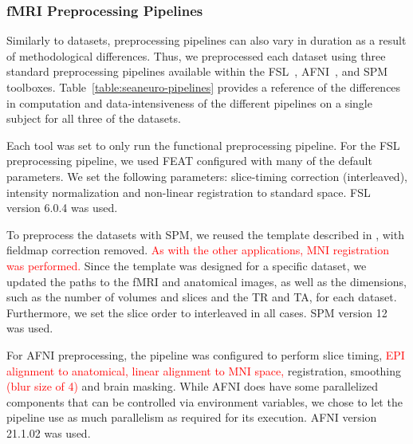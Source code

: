 \documentclass[pdflatex,sn-mathphys-num]{sn-jnl}
\newcommand{\vhs}[1]{\textcolor{red}{#1}}
\theoremstyle{thmstyleone}%
\theoremstyle{thmstyletwo}%
\theoremstyle{thmstylethree}%
\begin{document}
    
    
    \subsubsection{fMRI Preprocessing Pipelines}
    
    Similarly to datasets, preprocessing pipelines can also vary in duration as
    a result of methodological differences. Thus, we preprocessed each dataset
    using three standard preprocessing pipelines available within the FSL~\cite{fsl},
    AFNI~\cite{cox1996afni}, and SPM~\cite{spm} toolboxes.
    Table~\ref{table:seaneuro-pipelines} provides a reference of the differences
    in computation and data-intensiveness of the different pipelines on a single
    subject for all three of the datasets.
    
    Each tool was set to only run the functional preprocessing pipeline. For the FSL preprocessing pipeline, 
    we used FEAT configured with many of
    the default parameters. We set the following parameters: slice-timing
    correction (interleaved), intensity normalization and non-linear
    registration to standard space. FSL version 6.0.4 was used.
    
    To preprocess the datasets with SPM, we reused the template described in
    \cite{haitas2021age}, with fieldmap correction removed. \vhs{As with the other applications, MNI registration was performed.} Since the template was
    designed for a specific dataset, we updated the paths to the fMRI and
    anatomical images, as well as the dimensions, such as the number of volumes
    and slices and the TR and TA, for each dataset. Furthermore, we set the
    slice order to interleaved in all cases. SPM version 12 was used.
    
    For AFNI preprocessing, the pipeline was configured to perform slice timing, \vhs{EPI alignment to anatomical, 
    linear alignment to MNI space,} registration, smoothing \vhs{(blur size of 4)} and brain masking.
    While AFNI does have some parallelized components that can be controlled via
    environment variables, we chose to let the pipeline use as much parallelism
    as required for its execution. AFNI version 21.1.02 was used.
\end{document}
